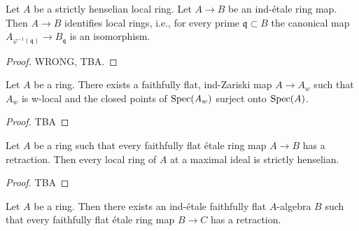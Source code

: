 \begin{lemma}
  \label{thm:ind-etale-strictly-henselian-identifies-local-rings}
  Let \(A\) be a strictly henselian local ring. Let \(A \to B\) be an ind-étale ring map. Then \(A \to B\) identifies local rings, i.e., for every prime \(\mathfrak{q} \subset B\) the canonical map \(A_{\varphi^{-1}(\mathfrak{q})} \to B_{\mathfrak{q}}\) is an isomorphism.
\end{lemma}

\begin{proof}
  WRONG, TBA.
\end{proof}

\begin{proposition}
    Let $A$ be a ring. There exists a faithfully flat, ind-Zariski map $A \to A_{w}$ such
    that $A_w$ is w-local and the closed points of $\mathrm{Spec}(A_w)$ surject onto $\mathrm{Spec}(A)$.
    \label{prop:exists-ind-zariski-w-local}
\end{proposition}

\begin{proof}
    TBA
\end{proof}

\begin{lemma}
    Let $A$ be a ring such that every faithfully flat étale ring map $A \to B$ has
    a retraction. Then every local ring of $A$ at a maximal ideal is strictly henselian.
    \label{lemma:retractions-strictly-henselian}
\end{lemma}

\begin{proof}
    TBA
\end{proof}

\begin{proposition}
    Let $A$ be a ring. Then there exists an ind-étale faithfully flat $A$-algebra $B$ such that
    every faithfully flat étale ring map $B \to C$ has a retraction.
    \label{prop:exists-ind-etale-retraction-etale}
\end{proposition}

